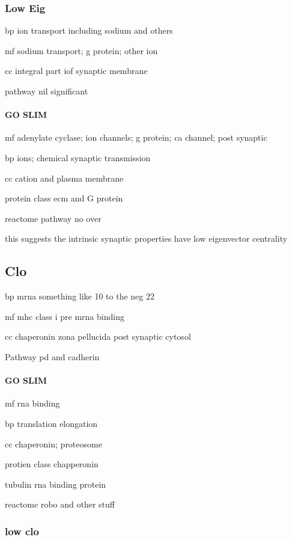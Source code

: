\subsubsection{Low Eig}

bp ion transport including sodium and others

mf sodium transport; g protein; other ion

cc integral part iof synaptic membrane

pathway nil significant

\paragraph{GO SLIM}

mf adenylate cyclase; ion channels; g protein; ca channel; post synaptic

bp ions; chemical synaptic transmission

cc cation and plasma membrane

protein class ecm and G protein

reactome pathway no over





this suggests the intrinsic synaptic properties have low eigenvector centrality
\subsection{Clo}

bp mrna something like 10 to the neg 22

mf mhc class i pre mrna binding

cc chaperonin zona pellucida  post synaptic cytosol

Pathway pd and cadherin

\paragraph{GO SLIM}

mf rna binding

bp translation elongation

cc chaperonin; proteosome 


protien class chapperonin


tubulin rna binding protein

reactome robo and other stuff

\subsubsection{low clo}

